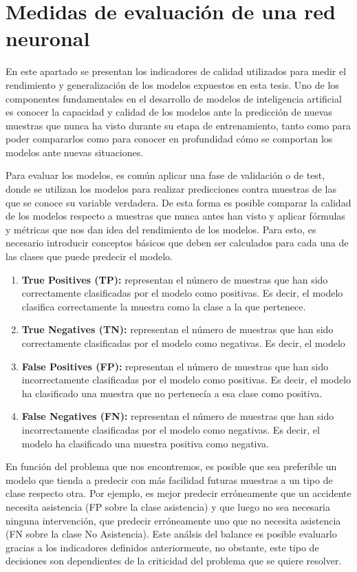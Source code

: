 \documentclass{uathesis-es}
\begin{document}
\section{Medidas de evaluación de una red neuronal}

En este apartado se presentan los indicadores de calidad utilizados para medir el rendimiento y generalización de los modelos expuestos en esta tesis. Uno de los componentes fundamentales en el desarrollo de modelos de inteligencia artificial es conocer la capacidad y calidad de los modelos ante la predicción de nuevas muestras que nunca ha visto durante su etapa de entrenamiento, tanto como para poder compararlos como para conocer en profundidad cómo se comportan los modelos ante nuevas situaciones.

Para evaluar los modelos, es común aplicar una fase de validación o de test, donde se utilizan los modelos para realizar predicciones contra muestras de las que se conoce su variable verdadera. De esta forma es posible comparar la calidad de los modelos respecto a muestras que nunca antes han visto y aplicar fórmulas y métricas que nos dan idea del rendimiento de los modelos. Para esto, es necesario introducir conceptos básicos que deben ser calculados para cada una de las clases que puede predecir el modelo.

\begin{enumerate}
    \item \textbf{True Positives (TP):} representan el número de muestras que han sido correctamente clasificadas por el modelo como positivas. Es decir, el modelo clasifica correctamente la muestra como la clase a la que pertenece.
    \item \textbf{True Negatives (TN):} representan el número de muestras que han sido correctamente clasificadas por el modelo como negativas. Es decir, el modelo
    \item \textbf{False Positives (FP):} representan el número de muestras que han sido incorrectamente clasificadas por el modelo como positivas. Es decir, el modelo ha clasificado una muestra que no pertenecía a esa clase como positiva.
    \item \textbf{False Negatives (FN):} representan el número de muestras que han sido incorrectamente clasificadas por el modelo como negativas. Es decir, el modelo ha clasificado una muestra positiva como negativa.
\end{enumerate}

En función del problema que nos encontremos, es posible que sea preferible un modelo que tienda a predecir con más facilidad futuras muestras a un tipo de clase respecto otra. Por ejemplo, es mejor predecir erróneamente que un accidente necesita asistencia (FP sobre la clase asistencia) y que luego no sea necesaria ninguna intervención, que predecir erróneamente uno que no necesita asistencia (FN sobre la clase No Asistencia). Este análsis del balance es posible evaluarlo gracias a los indicadores definidos anteriormente, no obstante, este tipo de decisiones son dependientes de la criticidad del problema que se quiere resolver.
\end{document}
